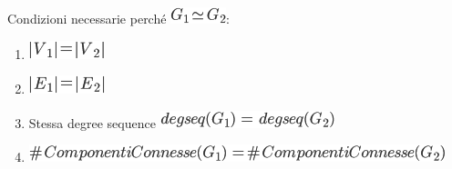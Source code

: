 \documentclass{article}
\providecommand{\tightlist}{%
  \setlength{\itemsep}{0pt}\setlength{\parskip}{0pt}}
\begin{document}
{Condizioni necessarie perché }\includegraphics{images/image433.png}{:}

\begin{enumerate}
\tightlist
\item
  \includegraphics{images/image434.png}
\item
  \includegraphics{images/image435.png}
\item
  {Stessa degree sequence }\includegraphics{images/image436.png}
\item
  \includegraphics{images/image437.png}
\end{enumerate}

{}

{}

\protect\hypertarget{t.b6067c6d36f86489b9093689693d69077c2015d4}{}{}\protect\hypertarget{t.39}{}{}
\end{document}
